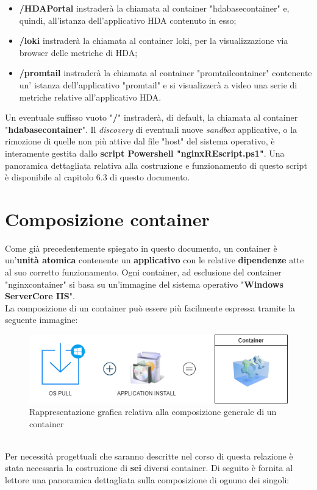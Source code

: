 \begin{itemize}
	\item \textbf{/HDAPortal} instraderà la chiamata al container "hdabasecontainer" e, quindi, all'istanza dell'applicativo HDA contenuto in esso;
	\item \textbf{/loki} instraderà la chiamata al container loki, per la visualizzazione via browser delle metriche di HDA;
	\item \textbf{/promtail} instraderà la chiamata al container "promtailcontainer" contenente un' istanza dell'applicativo "promtail" e si visualizzerà a video una serie di metriche relative all'applicativo HDA.
\end{itemize}
Un eventuale suffisso vuoto "\textbf{/}" instraderà, di default, la chiamata al container "\textbf{hdabasecontainer}".
Il \textit{discovery} di eventuali nuove \textit{sandbox} applicative, o la rimozione di quelle non più attive dal file "host" del sistema operativo, è interamente gestita dallo \textbf{script Powershell "nginxREscript.ps1"}. Una panoramica dettagliata relativa alla costruzione e funzionamento di questo script è disponibile al capitolo 6.3 di questo documento.

\section{Composizione container}
Come già precedentemente spiegato in questo documento, un container è un'\textbf{unità atomica} contenente un \textbf{applicativo} con le relative \textbf{dipendenze} atte al suo corretto funzionamento. Ogni container, ad esclusione del container "nginxcontainer" si basa su un'immagine del sistema operativo "\textbf{Windows ServerCore IIS}".\\
La composizione di un container può essere più facilmente espressa tramite la seguente immagine:
\begin{figure}[!h]     
\centering 
    \includegraphics[width=0.5\columnwidth]{immagini/img/container_structure} 
    \caption{Rappresentazione grafica relativa alla composizione generale di un container}
\end{figure} \\
Per necessità progettuali che saranno descritte nel corso di questa relazione è stata necessaria la costruzione di \textbf{sei} diversi container. Di seguito è fornita al lettore una panoramica dettagliata sulla composizione di ognuno dei singoli:

